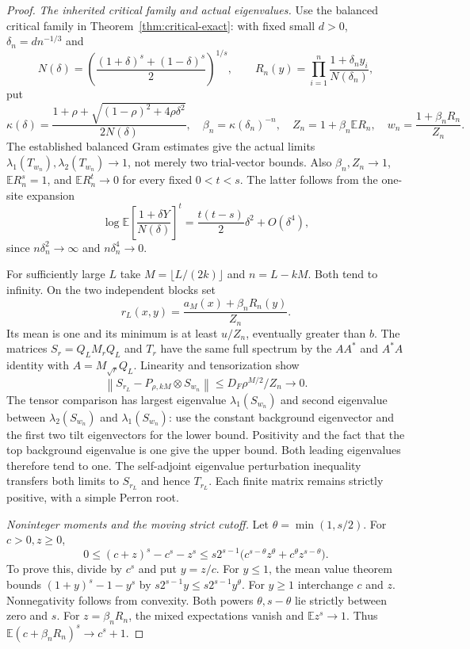 \documentclass[11pt]{article}
\begin{document}
\begin{proof}
\emph{The inherited critical family and actual eigenvalues.}
Use the balanced critical family in Theorem~\ref{thm:critical-exact}:
with fixed small $d>0$, $\delta_n=dn^{-1/3}$ and
\[
 N(\delta)=\left(\frac{(1+\delta)^s+(1-\delta)^s}{2}\right)^{1/s},
 \qquad R_n(y)=\prod_{i=1}^n\frac{1+\delta_n y_i}{N(\delta_n)},
\]
put
\[
 \kappa(\delta)=\frac{1+\rho+
 \sqrt{(1-\rho)^2+4\rho\delta^2}}{2N(\delta)},\quad
 \beta_n=\kappa(\delta_n)^{-n},\quad
 Z_n=1+\beta_n\mathbb ER_n,\quad
 w_n=\frac{1+\beta_nR_n}{Z_n}.
\]
The established balanced Gram estimates give the actual limits
$\lambda_1(T_{w_n}),\lambda_2(T_{w_n})\to1$, not merely two
trial-vector bounds. Also $\beta_n,Z_n\to1$, $\mathbb ER_n^s=1$,
and $\mathbb ER_n^t\to0$ for every fixed $0<t<s$.
The latter follows from the one-site expansion
\[
 \log\mathbb E\left[\frac{1+\delta Y}{N(\delta)}\right]^t
 =\frac{t(t-s)}2\delta^2+O(\delta^4),
\]
since $n\delta_n^2\to\infty$ and $n\delta_n^4\to0$.

For sufficiently large $L$ take $M=\lfloor L/(2k)\rfloor$ and
$n=L-kM$. Both tend to infinity. On the two independent blocks set
\[
 r_L(x,y)=\frac{a_M(x)+\beta_nR_n(y)}{Z_n}.
\]
Its mean is one and its minimum is at least $u/Z_n$, eventually
greater than $b$. The matrices $S_r=Q_LM_rQ_L$ and $T_r$ have the
same full spectrum by the $AA^*$ and $A^*A$ identity with
$A=M_{\sqrt r}Q_L$. Linearity and tensorization show
\[
 \left\|S_{r_L}-P_{\rho,kM}\otimes S_{w_n}\right\|
 \le D_F\rho^{M/2}/Z_n\longrightarrow0.
\]
The tensor comparison has largest eigenvalue $\lambda_1(S_{w_n})$
and second eigenvalue between $\lambda_2(S_{w_n})$ and
$\lambda_1(S_{w_n})$: use the constant background eigenvector
and the first two tilt eigenvectors for the lower bound. Positivity
and the fact that the top background eigenvalue is one give the
upper bound. Both leading eigenvalues therefore tend to one.
The self-adjoint eigenvalue perturbation inequality transfers both
limits to $S_{r_L}$ and hence $T_{r_L}$. Each finite matrix remains
strictly positive, with a simple Perron root.

\emph{Noninteger moments and the moving strict cutoff.}
Let $\theta=\min(1,s/2)$. For $c>0,z\ge0$,
\begin{equation}\label{eq:318-mixed-powers}
 0\le(c+z)^s-c^s-z^s
 \le s2^{s-1}\big(c^{s-\theta}z^\theta+
                   c^\theta z^{s-\theta}\big).
\end{equation}
To prove this, divide by $c^s$ and put $y=z/c$. For $y\le1$,
the mean value theorem bounds $(1+y)^s-1-y^s$ by
$s2^{s-1}y\le s2^{s-1}y^\theta$. For $y\ge1$ interchange
$c$ and $z$. Nonnegativity follows from convexity. Both powers
$\theta,s-\theta$ lie strictly between zero and $s$.
For $z=\beta_nR_n$, the mixed expectations vanish and
$\mathbb Ez^s\to1$. Thus $\mathbb E(c+\beta_nR_n)^s\to c^s+1$.


\end{proof}
\end{document}
